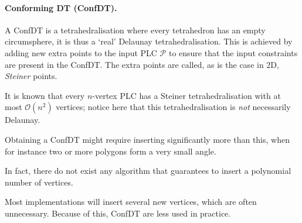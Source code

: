\paragraph*{Conforming DT (ConfDT).}

A ConfDT is a tetrahedralisation where every tetrahedron has an empty circumsphere, it is thus a `real' Delaunay tetrahedralisation.   
This is achieved by adding new extra points to the input PLC $\mathcal{P}$ to ensure that the input constraints are present in the ConfDT\@. 
The extra points are called, as is the case in 2D, \emph{Steiner} points.

% 

It is known that every $n$-vertex PLC has a Steiner tetrahedralisation with at most $\mathcal{O}(n^2)$ vertices; notice here that this tetrahedralisation is \emph{not} necessarily Delaunay.

Obtaining a ConfDT might require inserting significantly more than this, when for instance two or more polygons form a very small angle.

In fact, there do not exist any algorithm that guarantees to insert a polynomial number of vertices.

Most implementations will insert several new vertices, which are often unnecessary.
Because of this, ConfDT are less used in practice.






